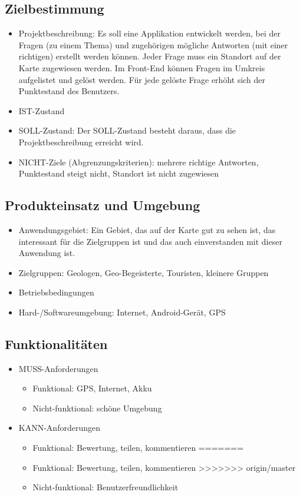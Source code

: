 \subsection{Zielbestimmung}
\begin{itemize}
	\item Projektbeschreibung:
	Es soll eine Applikation entwickelt werden, bei der Fragen (zu einem Thema) und zugehörigen mögliche Antworten (mit einer richtigen) erstellt werden können. Jeder Frage muss ein Standort auf der Karte zugewiesen werden. 
	Im Front-End können Fragen im Umkreis aufgelistet und gelöst werden. Für jede gelöste Frage erhöht sich der Punktestand des Benutzers.  
	
	\item IST-Zustand
	
	
	\item SOLL-Zustand:
	Der SOLL-Zustand besteht daraus, dass die Projektbeschreibung erreicht wird. 
	\item NICHT-Ziele (Abgrenzungskriterien):
	mehrere richtige Antworten,
	Punktestand steigt nicht,
	Standort ist nicht zugewiesen
\end{itemize}
\subsection{Produkteinsatz und Umgebung}
\begin{itemize}
	\item Anwendungsgebiet:
	Ein Gebiet, das auf der Karte gut zu sehen ist, das interessant für die Zielgruppen ist und das auch einverstanden mit dieser Anwendung ist. 
	\item Zielgruppen:
	Geologen, Geo-Begeisterte, Touristen, kleinere Gruppen
	\item Betriebsbedingungen
	\item Hard-/Softwareumgebung:
	Internet, Android-Gerät, GPS
\end{itemize}
\subsection{Funktionalitäten}
\begin{itemize}
	\item MUSS-Anforderungen
	\begin{itemize}
		\item Funktional:
		GPS, Internet, Akku
		\item Nicht-funktional:
		schöne Umgebung
	\end{itemize}
	\item KANN-Anforderungen
	\begin{itemize}
<<<<<<< HEAD
		\item Funktional:
	Bewertung, teilen, kommentieren
=======
		\item Funktional: 
		Bewertung, teilen, kommentieren
>>>>>>> origin/master
		\item Nicht-funktional:
		Benutzerfreundlichkeit
	\end{itemize}
\end{itemize}
